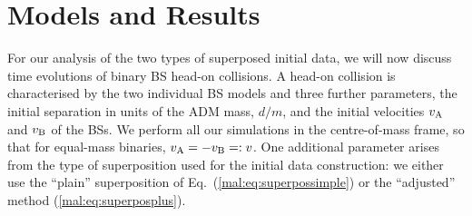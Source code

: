 
\section{Models and Results}
\label{mal:sec:results}
%
For our analysis of the two types of superposed initial data,
we will now discuss time evolutions of binary BS head-on collisions.
A head-on collision is characterised
by the two individual BS models and three further parameters,
the initial separation in units of the ADM mass,
$d/m$,
and the initial velocities $v_{\rm A}$ and
$v_{\rm B}$ of the BSs. We perform all our simulations in the centre-of-mass
frame, so that for equal-mass binaries, $v_{\rm A}=-v_{\rm B} =: v$.
One additional parameter arises from the type of superposition
used for the initial data construction: we either use the
``plain'' superposition of Eq.~(\ref{mal:eq:superpossimple}) or
the ``adjusted'' method (\ref{mal:eq:superposplus}).

